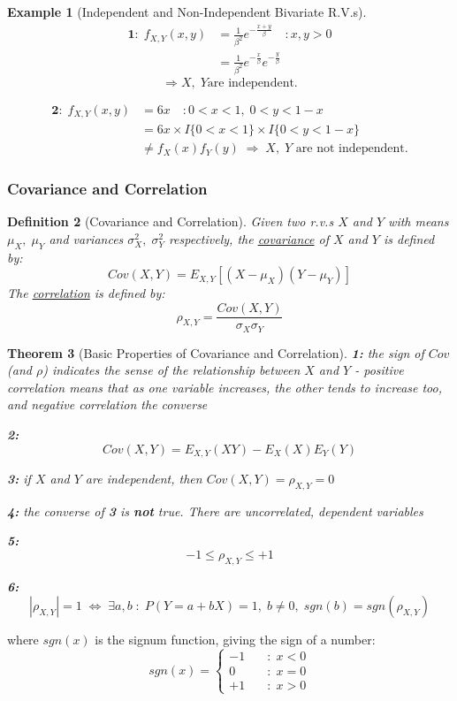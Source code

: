 \documentclass[12pt,a4paper]{article}
\newtheorem{thm}{Theorem}[subsection]
\newtheorem{defn}[thm]{Definition}
\newtheorem{ex}[thm]{Example}
\begin{document}
\begin{ex}[Independent and Non-Independent Bivariate R.V.s]

\begin{align*}
\mathbf{1\!: }\; f_{X,Y}(x,y) &= \frac{1}{\beta^2}e^{-\frac{x+y}{\beta}}\quad : x,y>0\\
&= \frac{1}{\beta^2}e^{-\frac{x}{\beta}}e^{-\frac{y}{\beta}}
\end{align*}
$$\Rightarrow X,\;Y \text{are independent.}$$

\begin{align*}
\mathbf{2\!: }\; f_{X,Y}(x,y) &= 6x\quad : 0<x<1,\; 0<y<1-x\\
&= 6x \times I\{0<x<1\} \times I\{0<y<1-x\}\\
&\neq f_X(x)f_Y(y)\; \Rightarrow\; X,\; Y \text{ are not independent.}
\end{align*}

\end{ex}

\subsubsection{Covariance and Correlation}

\begin{defn}[Covariance and Correlation]\vspace{1cm}

Given two r.v.s $X$ and $Y$ with means $\mu_X,\; \mu_Y$ and variances $\sigma_X^2,\; \sigma_Y^2$ respectively, the \underline{covariance} of $X$ and $Y$ is defined by:
$$Cov(X,Y) = E_{X,Y}[(X-\mu_X)(Y-\mu_Y)]$$
The \underline{correlation} is defined by:
$$\rho_{X,Y} = \frac{Cov(X,Y)}{\sigma_X \sigma_Y}$$
\end{defn}

\begin{thm}[Basic Properties of Covariance and Correlation]\vspace{1cm}

\noindent\textbf{1: } the sign of $Cov$ (and $\rho$) indicates the sense of the relationship between $X$ and $Y$ - positive correlation means that as one variable increases, the other tends to increase too, and negative correlation the converse

\noindent\textbf{2: } $$Cov(X,Y) = E_{X,Y}(XY) - E_{X}(X)E_{Y}(Y)$$

\noindent\textbf{3: } if $X$ and $Y$ are independent, then $Cov(X,Y) = \rho_{X,Y} = 0$

\noindent\textbf{4: } the converse of \textbf{3} is \textbf{not} true. There are uncorrelated, dependent variables

\noindent\textbf{5: } $$-1 \leq \rho_{X,Y} \leq +1$$

\noindent\textbf{6: } $$|\rho_{X,Y}| = 1 \; \Leftrightarrow\; \exists a,b \; : \; P(Y=a+bX) = 1,\; b\neq 0,\; sgn(b) = sgn(\rho_{X,Y})$$
\end{thm}
where $sgn(x)$ is the signum function, giving the sign of a number:
$$sgn(x) = \left\{\begin{array}{cl} -1\quad& : \; x<0\\ 0\quad& : \; x=0\\ +1\quad& :\; x >0\end{array}\right.$$
\end{document}
